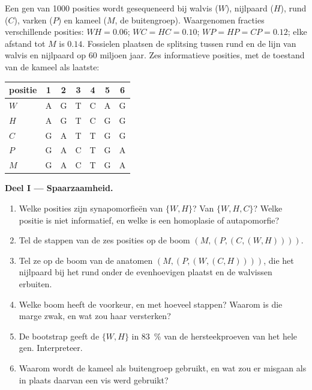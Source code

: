 \begin{problem}
\label{pb:b2:phylogenetic-trees:1}
Een gen van \num{1000} posities wordt gesequeneerd bij walvis ($W$), nijlpaard
($H$), rund ($C$), varken ($P$) en kameel ($M$, de buitengroep). Waargenomen
fracties verschillende posities: $WH = 0.06$; $WC = HC = 0.10$; $WP =
HP = CP = 0.12$; elke afstand tot $M$ is $0.14$. Fossielen plaatsen de
splitsing tussen rund en de lijn van walvis en nijlpaard op 60 miljoen jaar.
Zes informatieve posities, met de toestand van de kameel als laatste:
\begin{center}
\begin{tabular}{l@{\quad}cccccc}
positie & 1 & 2 & 3 & 4 & 5 & 6 \\ \hline
$W$ & A & G & T & C & A & G \\
$H$ & A & G & T & C & G & G \\
$C$ & G & A & T & T & G & G \\
$P$ & G & A & C & T & G & A \\
$M$ & G & A & C & T & G & A \\
\end{tabular}
\end{center}

\medskip
\noindent\textbf{Deel I --- Spaarzaamheid.}
\begin{enumerate}
  \item Welke posities zijn synapomorfieën van $\{W, H\}$? Van $\{W, H,
        C\}$? Welke positie is niet informatief, en welke is een homoplasie
        of autapomorfie?
  \item Tel de stappen van de zes posities op de boom
        $(M,(P,(C,(W,H))))$.
  \item Tel ze op de boom van de anatomen $(M,(P,(W,(C,H))))$,
        die het nijlpaard bij het rund onder de evenhoevigen plaatst en
        de walvissen erbuiten.
  \item Welke boom heeft de voorkeur, en met hoeveel stappen? Waarom is die
        marge zwak, en wat zou haar versterken?
  \item De bootstrap geeft de  $\{W, H\}$ in \qty{83}{\%} van de
        hersteekproeven van het hele gen. Interpreteer.
  \item Waarom wordt de kameel als buitengroep gebruikt, en wat zou er
        misgaan als in plaats daarvan een vis werd gebruikt?
\end{enumerate}


\end{problem}
